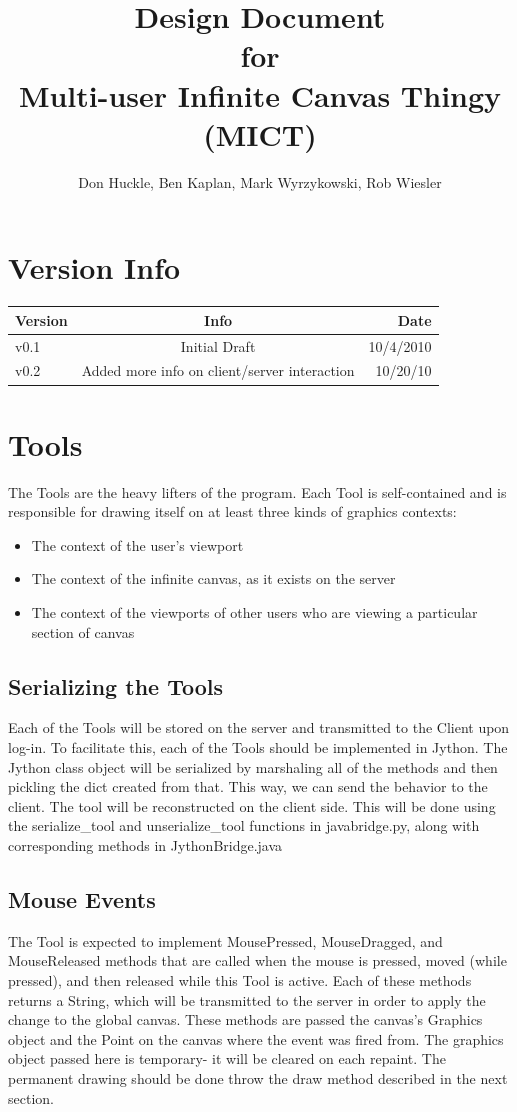 \documentclass[11pt,oneside,a4paper]{article}
\title{Design Document \\ for \\ Multi-user Infinite Canvas Thingy (MICT)}
\author{Don Huckle, Ben Kaplan, Mark Wyrzykowski, Rob Wiesler}
\begin{document}
\maketitle
\tableofcontents
\pagebreak
\section{Version Info}

\begin{tabular}{| l | c | r |}  \hline
\textbf{Version} & \textbf{Info} & \textbf{Date} \\ \hline
v0.1 & Initial Draft & 10/4/2010 \\ \hline
v0.2 & Added more info on client/server interaction & 10/20/10 \\ \hline
\end{tabular}

\section{Tools}
  The Tools are the heavy lifters of the program. Each Tool is self-contained
  and is responsible for drawing itself on at least three kinds of graphics
  contexts:
 \begin{itemize}
  \item The context of the user's viewport
  \item The context of the infinite canvas, as it exists on the server
  \item The context of the viewports of other users who are viewing a particular section of canvas
 \end{itemize}

 \subsection{Serializing the Tools}
  Each of the Tools will be stored on the server and transmitted to the Client
  upon log-in. To facilitate this, each of the Tools should be implemented in
  Jython. The Jython class object will be serialized by marshaling all of the
  methods and then pickling the dict created from that. This way, we can send
  the behavior to the client. The tool will be reconstructed on the client
  side. This will be done using the serialize\_tool and unserialize\_tool
  functions in javabridge.py, along with corresponding methods in
  JythonBridge.java
  
  \subsection{Mouse Events}
  The Tool is expected to implement MousePressed, MouseDragged, and
  MouseReleased methods that are called when the mouse is pressed, moved (while
  pressed), and then released while this Tool is active. Each of these methods
  returns a String, which will be transmitted to the server in order to apply the
  change to the global canvas.  These methods are passed the canvas's Graphics
  object and the Point on the canvas where the event was fired from. The
  graphics object passed here is temporary- it will be cleared on each repaint.
  The permanent drawing should be done throw the draw method described in the
  next section.
\end{document}
